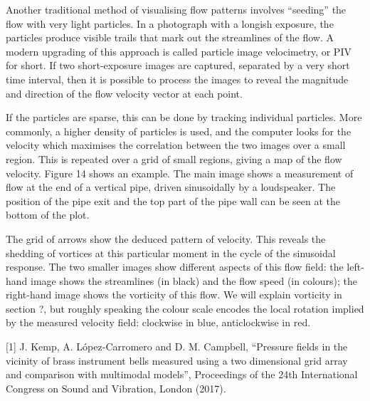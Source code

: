   Another traditional method of visualising flow patterns involves “seeding” 
  the flow with very light particles. In a photograph with a longish exposure, 
  the particles produce visible trails that mark out the streamlines of the 
  flow. A modern upgrading of this approach is called particle image 
  velocimetry, or PIV for short. If two short-exposure images are captured, 
  separated by a very short time interval, then it is possible to process the 
  images to reveal the magnitude and direction of the flow velocity vector at 
  each point. 

  If the particles are sparse, this can be done by tracking individual 
  particles. More commonly, a higher density of particles is used, and the 
  computer looks for the velocity which maximises the correlation between the 
  two images over a small region. This is repeated over a grid of small 
  regions, giving a map of the flow velocity. Figure 14 shows an example. The 
  main image shows a measurement of flow at the end of a vertical pipe, driven 
  sinusoidally by a loudspeaker. The position of the pipe exit and the top part 
  of the pipe wall can be seen at the bottom of the plot. 


  The grid of arrows show the deduced pattern of velocity. This reveals the 
  shedding of vortices at this particular moment in the cycle of the sinusoidal 
  response. The two smaller images show different aspects of this flow field: 
  the left-hand image shows the streamlines (in black) and the flow speed (in 
  colours); the right-hand image shows the vorticity of this flow. We will 
  explain vorticity in section ?, but roughly speaking the colour scale encodes 
  the local rotation implied by the measured velocity field: clockwise in blue, 
  anticlockwise in red. 



  \sectionreferences{}[1] J. Kemp, A. López-Carromero and D. M. Campbell, 
  “Pressure fields in the vicinity of brass instrument bells measured using a 
  two dimensional grid array and comparison with multimodal models”, 
  Proceedings of the 24th International Congress on Sound and Vibration, London 
  (2017). 

